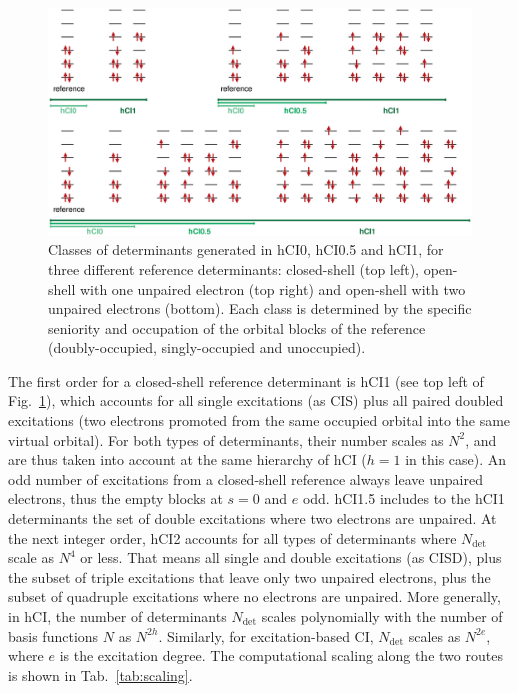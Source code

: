 \documentclass[aip,jcp,reprint,noshowkeys,superscriptaddress]{revtex4-1}
\newcommand{\Ndet}{N_\text{det}}
\begin{document}
\begin{figure}%
\includegraphics[width=1.0\linewidth]{determinants}
\caption{Classes of determinants generated in hCI0, hCI0.5 and hCI1, for three different reference determinants:
closed-shell (top left), open-shell with one unpaired electron (top right) and open-shell with two unpaired electrons (bottom).
Each class is determined by the specific seniority and occupation of the orbital blocks of the reference (doubly-occupied, singly-occupied and unoccupied).
}
\label{fig:determinants}
\end{figure}

The first order for a closed-shell reference determinant is hCI1 (see top left of Fig.~\ref{fig:determinants}), which accounts for all single excitations (as CIS) 
plus all paired doubled excitations (two electrons promoted from the same occupied orbital into the same virtual orbital).
For both types of determinants, their number scales as $N^2$, and are thus taken into account at the same hierarchy of hCI ($h=1$ in this case).
An odd number of excitations from a closed-shell reference always leave unpaired electrons, thus the empty blocks at $s=0$ and $e$ odd.
hCI1.5 includes to the hCI1 determinants the set of double excitations where two electrons are unpaired.
At the next integer order, hCI2 accounts for all types of determinants where $\Ndet$ scale as $N^4$ or less.
That means all single and double excitations (as CISD), plus the subset of triple excitations that leave only two unpaired electrons, 
plus the subset of quadruple excitations where no electrons are unpaired.
More generally, in hCI, the number of determinants $\Ndet$ scales polynomially with the number of basis functions $N$ as $N^{2h}$.
Similarly, for excitation-based CI, $\Ndet$ scales as $N^{2e}$, where $e$ is the excitation degree.
The computational scaling along the two routes is shown in Tab.~\ref{tab:scaling}.
 
\end{document}
